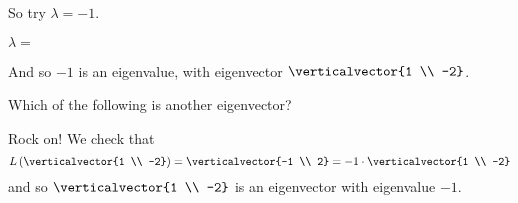 \documentclass{ximera}
\begin{document}
\begin{question}
\begin{solution}
\begin{hint}
\begin{question}
\begin{solution}
          \begin{hint}
            So try $\lambda = -1$.
          \end{hint}

          $\lambda = $ 
        \end{solution}

        And so $-1$ is an eigenvalue, with eigenvector $\verticalvector{1 \\ -2}$.
      \end{question}
    \end{hint}

    Which of the following is another eigenvector?
    \begin{multiple-choice}
    \end{multiple-choice}
  \end{solution}

  Rock on!  We check that 
  $$
  L\left( \verticalvector{1 \\ -2} \right) = \verticalvector{-1 \\ 2} = -1 \cdot \verticalvector{1 \\ -2}
  $$
  and so $\verticalvector{1 \\ -2}$ is an eigenvector with eigenvalue $-1$.
\end{question}
\end{document}

